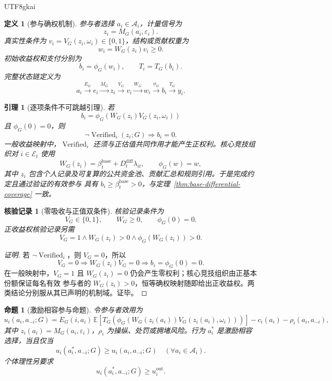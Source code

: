 \documentclass[12pt,a4paper,openany]{report}
\newtheorem{definition}{定义}[chapter]
\newtheorem{lemma}{引理}[chapter]
\newtheorem{proposition}{命题}[chapter]
\newtheorem{Certificate}{核验记录}[chapter]
\newcommand{\EE}{\mathbb E}
\newcommand{\Act}{\mathcal A}
\DeclareMathOperator{\Verified}{Verified}
\begin{document}
\begin{CJK*}{UTF8}{gkai}
\begin{definition}[参与确权机制]
参与者选择 \(a_i\in\Act_i\)，计量信号为
\[
  z_i=M_G(a_i,\varepsilon_i).
\]
真实性条件为 \(v_i=V_G(z_i,\omega_i)\in\{0,1\}\)，结构或贡献权重为
\[
  w_i=W_G(z_i)v_i\ge0.
\]
初始收益权和支付分别为
\[
  b_i=\phi_G(w_i),\qquad
  T_i=T_G(b_i).
\]
完整状态链定义为
\[
  a_i
  \xrightarrow{E_G}
  e_i
  \xrightarrow{M_G}
  z_i
  \xrightarrow{V_G}
  v_i
  \xrightarrow{W_G}
  w_i
  \xrightarrow{\phi_G}
  b_i
  \xrightarrow{T_G}
  y_i.
\]
\end{definition}

\begin{lemma}[逐项条件不可跳越引理]
\label{lem:atomic-gates-no-skip}
若
\[
  b_i=\phi_G(W_G(z_i)V_G(z_i,\omega_i))
\]
且 \(\phi_G(0)=0\)，则
\[
  \neg\Verified_i(z_i;G)
  \Longrightarrow
  b_i=0.
\]
一般收益映射中，\(\Verified_i\) 还须与正估值共同作用才能产生正权利。核心竞技组织对
\(i\in\mathcal E_t\) 使用
\[
  W_G(z_i)=\beta_t^{\mathrm{base}}+D_t^{\mathrm{diff}}\lambda_{it},
  \qquad \phi_G(w)=w,
\]
其中 \(z_i\) 包含个人记录及可复算的公共资金池、贡献汇总和规则引用。于是完成约定且通过验证的有效参与
具有 \(b_i\ge\beta_t^{\mathrm{base}}>0\)，与定理~\ref{thm:base-differential-coverage} 一致。
\end{lemma}

\begin{Certificate}[零吸收与正值双条件]
核验记录条件为
\[
  V_G\in\{0,1\},\qquad W_G\ge0,\qquad \phi_G(0)=0.
\]
正收益权核验记录另需
\[
  V_G=1\wedge W_G(z_i)>0\wedge\phi_G(W_G(z_i))>0.
\]
\end{Certificate}

\begin{proof}[证明]
若 \(\neg\Verified_i\)，则 \(V_G=0\)，所以
\[
  V_G=0
  \Longrightarrow
  W_G(z_i)V_G=0
  \Longrightarrow
  b_i=\phi_G(0)=0.
\]
在一般映射中，\(V_G=1\) 且 \(W_G(z_i)=0\) 仍会产生零权利；核心竞技组织由正基本份额保证每名有效
参与者的 \(W_G(z_i)>0\)，恒等确权映射随即给出正收益权。两类结论分别服从其已声明的机制域。证毕。
\end{proof}

\begin{proposition}[激励相容参与命题]
\label{prop:participation-incentive-compatibility}
令参与者效用为
\[
  u_i(a_i,a_{-i};G)
  =
  E_G(i,a_i)\,
  \EE\!\left[
  T_G\!\left(
  \phi_G\!\left(
  W_G(z_i(a_i))V_G(z_i(a_i),\omega_i)
  \right)\right)\right]
  -c_i(a_i)-\rho_i(a_i,a_{-i}),
\]
其中 \(z_i(a_i)=M_G(a_i,\varepsilon_i)\)，\(\rho_i\) 为操纵、处罚或拥堵风险。行为 \(a_i^*\) 是激励相容选择，当且仅当
\[
  u_i(a_i^*,a_{-i};G)
  \ge
  u_i(a_i,a_{-i};G)
  \quad
  (\forall a_i\in\Act_i).
\]
个体理性另要求
\[
  u_i(a_i^*,a_{-i};G)\ge u_i^{\mathrm{out}}.
\]
\end{proposition}


\end{CJK*}
\end{document}
